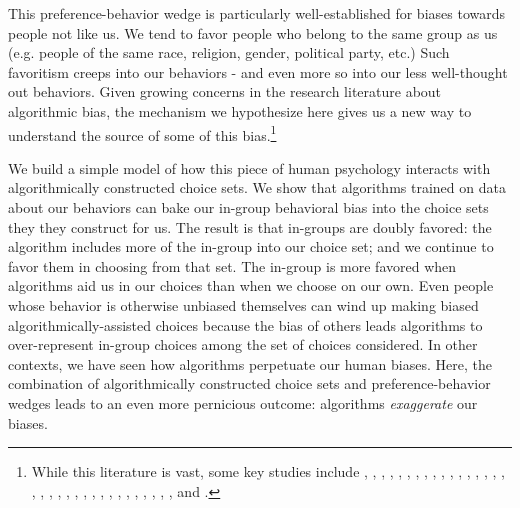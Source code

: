 \documentclass[12pt,letterpaper]{article}
\begin{document}
This preference-behavior wedge is particularly well-established for biases towards people not like us. We tend to favor people who belong to the same group as us (e.g. people of the same race, religion, gender, political party, etc.) Such favoritism creeps into our behaviors - and even more so into our less well-thought out behaviors. Given growing concerns in the research literature about algorithmic bias, the mechanism we hypothesize here gives us a new way to understand the source of some of this bias.\footnote{While this literature is vast, some key studies include \citealt{BarocasHardtNarayan-FairnessBook}, \citealt{BarocasSelbst2016}, \citealt{BolukbasiEtAl(16)}, \citealt{Boyd2012}, \citealt{CaliskanEtAl(17)}, \citealt{Chouldechova2017b}, \citealt{ChouldechovaRoth(20)}, \citealt{CorbettDaviesEtAl2017}, \citealt{CowgillTucker2019}, \citealt{Dwork2012}, \citealt{FusterEtAl(18)}, \citealt{GillisSpiess(19)}, \citealt{HardtPriceSrebro2016}, \citealt{HeidariEtAl(18)}, \citealt{HuChen(18)-WelfareFairness}, \citealt{KamishimaEtAl(11)}, \citealt{KamishimaEtAl(12)}, \citealt{KLMR(18)}, \citealt{KLMS(18)}, \citealt{KLMS(20)-PNAS}, \citealt{KM2019}, \citealt{LiptonEtAl(18)}, \citealt{LiuEtAl(18)}, \citealt{Mayson(18)}, \citealt{MenonWilliamson(18)}, \citealt{MitchellEtAl(19)}, \citealt{ObermeyerEtAl(19)}, \citealt{PleissEtAl(17)}, \citealt{RKM2017}, \citealt{RaghavanEtAl(19)}, \citealt{RambachanEtAl(20)-PP}, \citealt{RambachanEtAl(20)}, \citealt{RambachanRoth(19)-BiasInBiasOut}, \citealt{ZemelEtAl(13)}, and \citealt{ZafarEtAl(19)}. }

We build a simple model of how this piece of human psychology interacts with algorithmically constructed choice sets. We show that algorithms trained on data about our behaviors can bake our in-group behavioral bias into the choice sets they they construct for us. The result is that in-groups are doubly favored: the algorithm includes more of the in-group into our choice set; and we continue to favor them in choosing from that set. The in-group is more favored when algorithms aid us in our choices than when we choose on our own. Even people whose behavior is otherwise unbiased themselves can wind up making biased algorithmically-assisted choices because the bias of others leads algorithms to over-represent in-group choices among the set of choices considered. In other contexts, we have seen how algorithms perpetuate our human biases. Here, the combination of algorithmically constructed choice sets and preference-behavior wedges leads to an even more pernicious outcome: algorithms {\em exaggerate} our biases.  
\end{document}
